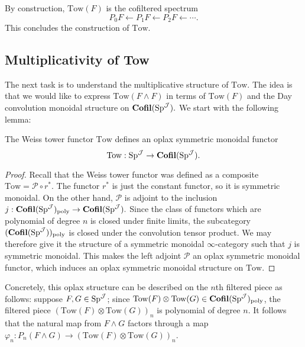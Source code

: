 \begin{cnstr}
By construction, $\mathrm{Tow}(F)$ is the cofiltered spectrum $$P_0 F\longleftarrow P_1 F \longleftarrow P_2 F \longleftarrow \cdots .$$  This concludes the construction of $\mathrm{Tow}.$
\end{cnstr}

\subsection{Multiplicativity of Tow}
The next task is to understand the multiplicative structure of $\mathrm{Tow}$.  The idea is that we would like to express $\mathrm{Tow}(F\wedge F)$ in terms of $\mathrm{Tow}(F)$ and the Day convolution monoidal structure on $\operatorname{\mathbf{Cofil}}(\operatorname{\mathrm{Sp}}^{\operatorname{\mathcal{J}}}).$  We start with the following lemma:  

\begin{lem}
The Weiss tower functor $\mathrm{Tow}$ defines an oplax symmetric monoidal functor $$\mathrm{Tow}: \operatorname{\mathrm{Sp}}^{\operatorname{\mathcal{J}}} \to \operatorname{\mathbf{Cofil}}(\operatorname{\mathrm{Sp}}^{\operatorname{\mathcal{J}}}).$$
\end{lem}
\begin{proof}
Recall that the Weiss tower functor was defined as a composite $\mathrm{Tow} = \mathcal{P} \circ r^*.$  The functor $r^*$ is just the constant functor, so it is symmetric monoidal.  On the other hand, $\mathcal{P}$ is adjoint to the inclusion $j: \operatorname{\mathbf{Cofil}}(\operatorname{\mathrm{Sp}}^{\operatorname{\mathcal{J}}})_{\text{poly}} \to \operatorname{\mathbf{Cofil}}(\operatorname{\mathrm{Sp}}^{\operatorname{\mathcal{J}}}).$  Since the class of functors which are polynomial of degree $n$ is closed under finite limits, the subcategory $(\operatorname{\mathbf{Cofil}}(\operatorname{\mathrm{Sp}}^{\operatorname{\mathcal{J}}}))_{\text{poly}}$ is closed under the convolution tensor product.  We may therefore give it the structure of a symmetric monoidal $\infty$-category such that $j$ is symmetric monoidal.  This makes the left adjoint $\mathcal{P}$ an oplax symmetric monoidal functor, which induces an oplax symmetric monoidal structure on $\mathrm{Tow}.$  \end{proof}

Concretely, this oplax structure can be described on the $n$th filtered piece as follows: suppose $F,G \in \operatorname{\mathrm{Sp}}^{\operatorname{\mathcal{J}}}$; since $\mathrm{Tow}(F) \otimes \mathrm{Tow}(G) \in  \operatorname{\mathbf{Cofil}}(\operatorname{\mathrm{Sp}}^{\operatorname{\mathcal{J}}})_{\text{poly}}$, the filtered piece $(\mathrm{Tow}(F) \otimes \mathrm{Tow}(G))_n$ is polynomial of degree $n$.  It follows that the natural map from $F\wedge G$ factors through a map $\varphi_n: P_n(F\wedge G)\to (\mathrm{Tow}(F) \otimes \mathrm{Tow}(G))_n$.  

